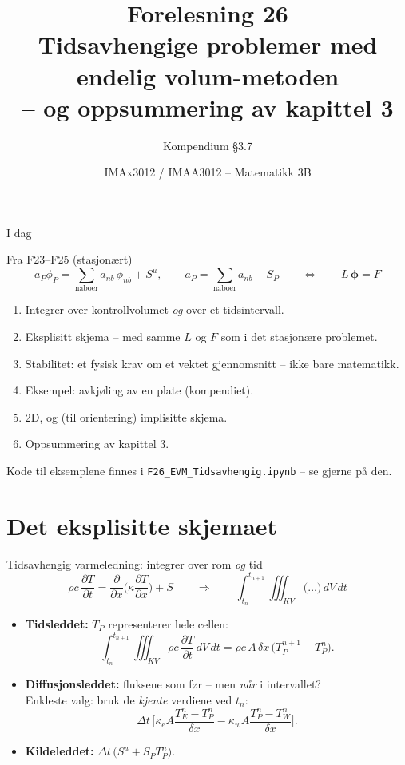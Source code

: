 \documentclass[11pt,aspectratio=169]{beamer}
\title[F26 -- Tidsavhengige problemer]{Forelesning 26\\ Tidsavhengige problemer med endelig volum-metoden\\ -- og oppsummering av kapittel 3}
\subtitle{Kompendium §3.7}
\author{IMAx3012 / IMAA3012 -- Matematikk 3B}
\date{}
\begin{document}
\begin{frame}
\titlepage
\end{frame}

\begin{frame}{I dag}
\begin{remb}{Fra F23--F25 (stasjonært)}
\[
a_P\phi_P = \sum_{\text{naboer}} a_{nb}\,\phi_{nb} + S^u, \qquad a_P = \sum_{\text{naboer}} a_{nb} - S_P
\qquad\Longleftrightarrow\qquad L\,\boldsymbol\phi = F
\]
\end{remb}
\begin{enumerate}
\item Integrer over kontrollvolumet \emph{og} over et tidsintervall.
\item Eksplisitt skjema -- med samme $L$ og $F$ som i det stasjonære problemet.
\item Stabilitet: et fysisk krav om et vektet gjennomsnitt -- ikke bare matematikk.
\item Eksempel: avkjøling av en plate (kompendiet).
\item 2D, og (til orientering) implisitte skjema.
\item Oppsummering av kapittel 3.
\end{enumerate}
\medskip
Kode til eksemplene finnes i \texttt{F26\_EVM\_Tidsavhengig.ipynb} -- se gjerne på den.
\end{frame}

\section{Det eksplisitte skjemaet}

\begin{frame}{Tidsavhengig varmeledning: integrer over rom \emph{og} tid}
\[
\rho c\,\frac{\partial T}{\partial t} = \frac{\partial}{\partial x}\Big(\kappa\frac{\partial T}{\partial x}\Big) + S
\qquad\Longrightarrow\qquad
\int_{t_n}^{t_{n+1}}\!\!\iiint_{KV} \big(\ldots\big)\,dV\,dt
\]
\begin{itemize}
\item \textbf{Tidsleddet:} $T_P$ representerer hele cellen:
\[
\int_{t_n}^{t_{n+1}}\!\!\iiint_{KV}\rho c\,\frac{\partial T}{\partial t}\,dV\,dt = \rho c\,A\,\delta x\,\big(T_P^{n+1} - T_P^n\big).
\]
\item \textbf{Diffusjonsleddet:} fluksene som før -- men \emph{når} i intervallet? \\
Enkleste valg: bruk de \emph{kjente} verdiene ved $t_n$:
\[
\Delta t\,\Big[\kappa_eA\frac{T_E^n - T_P^n}{\delta x} - \kappa_wA\frac{T_P^n - T_W^n}{\delta x}\Big].
\]
\item \textbf{Kildeleddet:} $\Delta t\,\big(S^u + S_PT_P^n\big)$.
\end{itemize}
\end{frame}
\end{document}
